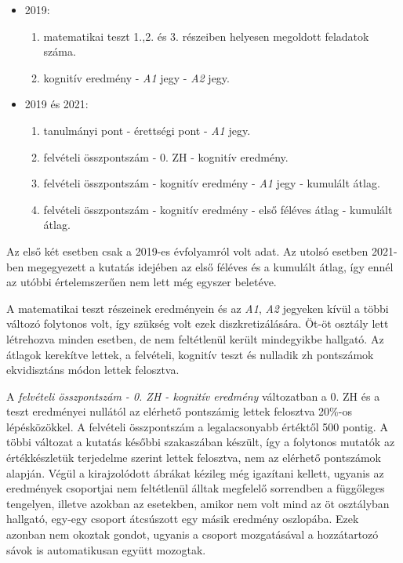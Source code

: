 \documentclass[12pt]{article}
\begin{document}
\begin{itemize}

\item 2019:

\begin{enumerate}
\item matematikai teszt 1.,2. és 3. részeiben helyesen megoldott feladatok száma.
\item kognitív eredmény - \textit{A1} jegy - \textit{A2} jegy.
\end{enumerate}

\item 2019 és 2021:

\begin{enumerate}
\item tanulmányi pont - érettségi pont - \textit{A1} jegy.
\item felvételi összpontszám - 0. ZH - kognitív eredmény.
\item felvételi összpontszám - kognitív eredmény - \textit{A1} jegy - kumulált átlag.
\item felvételi összpontszám - kognitív eredmény - első féléves átlag - kumulált átlag.
\end{enumerate}

\end{itemize}

Az első két esetben csak a 2019-es évfolyamról volt adat. Az utolsó esetben 2021-ben megegyezett a kutatás idejében az első féléves és a kumulált átlag, így ennél az utóbbi értelemszerűen nem lett még egyszer beletéve.

A matematikai teszt részeinek eredményein és az \textit{A1}, \textit{A2} jegyeken kívül a többi változó folytonos volt, így szükség volt ezek diszkretizálására. Öt-öt osztály lett létrehozva minden esetben, de nem feltétlenül került mindegyikbe hallgató. Az átlagok kerekítve lettek, a felvételi, kognitív teszt és nulladik zh pontszámok ekvidisztáns módon lettek felosztva.

A \textit{felvételi összpontszám - 0. ZH - kognitív eredmény} változatban a 0. ZH és a teszt eredményei nullától az elérhető pontszámig lettek felosztva 20\%-os lépésközökkel. A felvételi összpontszám a legalacsonyabb értéktől 500 pontig. A többi változat a kutatás későbbi szakaszában készült, így a folytonos mutatók az értékkészletük terjedelme szerint lettek felosztva, nem az elérhető pontszámok alapján. Végül a kirajzolódott ábrákat kézileg még igazítani kellett, ugyanis az eredmények csoportjai nem feltétlenül álltak megfelelő sorrendben a függőleges tengelyen, illetve azokban az esetekben, amikor nem volt mind az öt osztályban hallgató, egy-egy csoport átcsúszott egy másik eredmény oszlopába. Ezek azonban nem okoztak gondot, ugyanis a csoport mozgatásával a hozzátartozó sávok is automatikusan együtt mozogtak.
\end{document}
